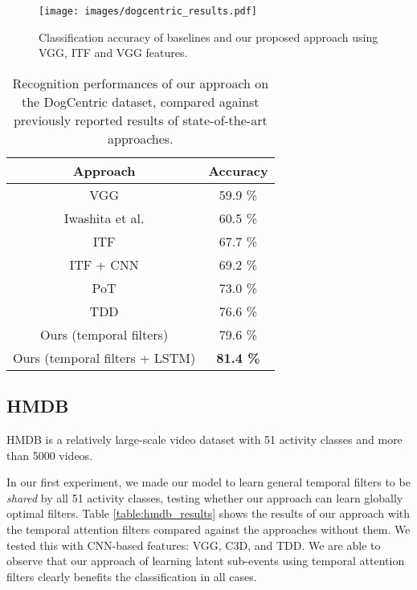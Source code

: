 \documentclass[letterpaper]{article}
\begin{document}
\begin{figure}[!tbp]
\begin{center}
   \texttt{[image: images/dogcentric\_results.pdf]}
\end{center}
\vspace{-20pt}
   \caption{Classification accuracy of baselines and our proposed approach using VGG, ITF and VGG features.}
\label{fig:dog_centric_plot}		
\end{figure}

\begin{table}
    \small
	\caption{Recognition performances of our approach on the DogCentric dataset, compared against previously reported results of state-of-the-art approaches.}
	\label{table:dog-compare}

	\center
	\setlength\extrarowheight{0pt}

		\begin{tabular}	{c|c}
			\hline 	Approach & Accuracy \tabularnewline
			\hline 	
			        VGG \cite{vgg}	& 	59.9 \%  \tabularnewline
			        Iwashita et al. \citeyear{ryoo14dog}    &   60.5 \%  \tabularnewline
			        ITF \cite{wang13}	& 	67.7 \%  \tabularnewline
			        ITF + CNN \cite{jain14}	& 	69.2 \%  \tabularnewline
			        PoT \cite{ryoo15}    &   73.0 \%  \tabularnewline
			        TDD \cite{tdd15} &   76.6 \%  \tabularnewline
			\hline
					Ours (temporal filters)	&   79.6 \%  \tabularnewline
					Ours (temporal filters + LSTM)  &  \bf{81.4} \% \tabularnewline
			\hline
		\end{tabular}

\end{table}






\subsection{HMDB}

HMDB is a relatively large-scale video dataset with 51 activity classes and more than 5000 videos.

In our first experiment, we made our model to learn general temporal filters to be \emph{shared} by all 51 activity classes, testing whether our approach can learn globally optimal filters. Table \ref{table:hmdb_results} shows the results of our approach with the temporal attention filters compared against the approaches without them. We tested this with CNN-based features: VGG, C3D, and TDD. We are able to observe that our approach of learning latent sub-events using temporal attention filters clearly benefits the classification in all cases. 
\end{document}
